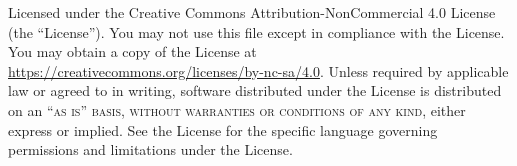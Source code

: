 Licensed under the Creative Commons Attribution-NonCommercial 4.0 License (the ``License'').
You may not use this file except in compliance with the License.
You may obtain a copy of the License at \url{https://creativecommons.org/licenses/by-nc-sa/4.0}.
Unless required by applicable law or agreed to in writing, software distributed under the License is distributed on
an \textsc{``as is'' basis, without warranties or conditions of any kind}, either express or implied.
See the License for the specific language governing permissions and limitations under the License.
